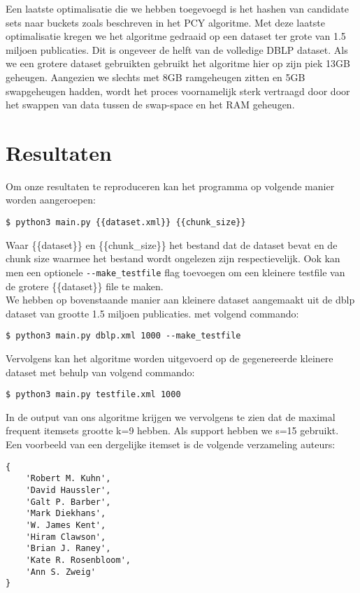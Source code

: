 \documentclass[11pt]{article}
\begin{document}
Een laatste optimalisatie die we hebben toegevoegd is het hashen van candidate sets naar buckets zoals beschreven in het PCY algoritme. Met deze laatste optimalisatie kregen we het algoritme gedraaid op een dataset ter grote van 1.5 miljoen publicaties. Dit is ongeveer de helft van de volledige DBLP dataset. Als we een grotere dataset gebruikten gebruikt het algoritme hier op zijn piek 13GB geheugen. Aangezien we slechts met 8GB ramgeheugen zitten en 5GB swapgeheugen hadden, wordt het proces voornamelijk sterk vertraagd door door het swappen van data tussen de swap-space en het RAM geheugen. 


\section{Resultaten}

Om onze resultaten te reproduceren kan het programma op volgende manier worden aangeroepen:

\begin{verbatim}
$ python3 main.py {{dataset.xml}} {{chunk_size}}
\end{verbatim}

Waar \{\{dataset\}\} en \{\{chunk\_size\}\} het bestand dat de dataset bevat en de chunk size waarmee het bestand wordt ongelezen zijn respectievelijk. Ook kan men een optionele \texttt{-{}-make\_testfile} flag toevoegen om een kleinere testfile van de grotere \{\{dataset\}\} file te maken.\\

We hebben op bovenstaande manier aan kleinere dataset aangemaakt uit de dblp dataset van grootte 1.5 miljoen publicaties. met volgend commando:

\begin{verbatim}
$ python3 main.py dblp.xml 1000 --make_testfile
\end{verbatim}

Vervolgens kan het algoritme worden uitgevoerd op de gegenereerde kleinere dataset met behulp van volgend commando:

\begin{verbatim}
$ python3 main.py testfile.xml 1000
\end{verbatim}

In de output van ons algoritme krijgen we vervolgens te zien dat de maximal frequent itemsets grootte k=9 hebben. Als support hebben we s=15 gebruikt. Een voorbeeld van een dergelijke itemset is de volgende verzameling auteurs: 

\begin{verbatim}
{
    'Robert M. Kuhn', 
    'David Haussler', 
    'Galt P. Barber', 
    'Mark Diekhans',
    'W. James Kent', 
    'Hiram Clawson',
    'Brian J. Raney',
    'Kate R. Rosenbloom',
    'Ann S. Zweig'
}
\end{verbatim}
\end{document}
